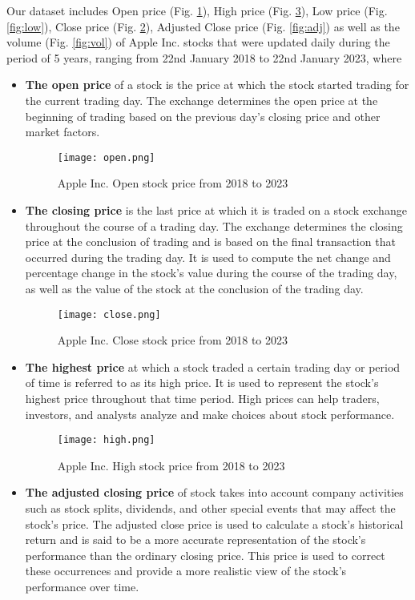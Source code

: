 \documentclass[a4paper]{article}
\begin{document}
Our dataset includes Open price (Fig. \ref{fig:open}), High price (Fig. \ref{fig:high}), Low price (Fig. \ref{fig:low}), Close price (Fig. \ref{fig:close}), Adjusted Close price (Fig. \ref{fig:adj}) as well as the volume (Fig. \ref{fig:vol}) of Apple Inc. stocks that were updated daily during the period of 5 years, ranging from 22nd January 2018 to 22nd January 2023, where
\begin{itemize}[leftmargin=7.5pt]
    \item \textbf{The open price} of a stock is the price at which the stock started trading for the current trading day. The exchange determines the open price at the beginning of trading based on the previous day's closing price and other market factors.
    \begin{figure}[!h]
    \centering
    \texttt{[image: open.png]}
    \caption{Apple Inc. Open stock price from 2018 to 2023}
    \label{fig:open}
\end{figure}
    \item \textbf{The closing price} is the last price at which it is traded on a stock exchange throughout the course of a trading day. The exchange determines the closing price at the conclusion of trading and is based on the final transaction that occurred during the trading day. It is used to compute the net change and percentage change in the stock's value during the course of the trading day, as well as the value of the stock at the conclusion of the trading day.
    \begin{figure}[!h]
    \centering
    \texttt{[image: close.png]}
    \caption{Apple Inc. Close stock price from 2018 to 2023}
    \label{fig:close}
\end{figure}
    \item \textbf{The highest price} at which a stock traded  a certain trading day or period of time is referred to as its high price. It is used to represent the stock's highest price throughout that time period. High prices can help traders, investors, and analysts analyze and make choices about stock performance.
    \begin{figure}[!h]
    \centering
    \texttt{[image: high.png]}
    \caption{Apple Inc. High stock price from 2018 to 2023}
    \label{fig:high}
\end{figure}
    \item \textbf{The adjusted closing price} of stock takes into account company activities such as stock splits, dividends, and other special events that may affect the stock's price. The adjusted close price is used to calculate a stock's historical return and is said to be a more accurate representation of the stock's performance than the ordinary closing price. This price is used to correct these occurrences and provide a more realistic view of the stock's performance over time.

\end{itemize}
\end{document}
